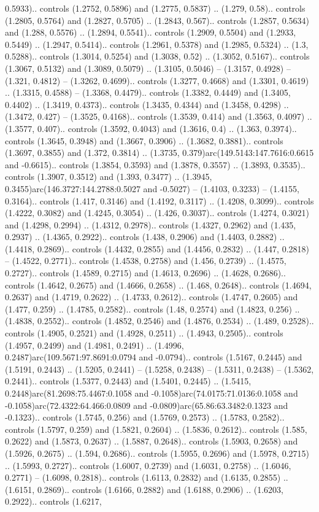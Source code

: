 0.5933).. controls (1.2752, 0.5896) and (1.2775, 0.5837) .. (1.279, 0.58).. controls (1.2805, 0.5764) and (1.2827, 0.5705) .. (1.2843, 0.567).. controls (1.2857, 0.5634) and (1.288, 0.5576) .. (1.2894, 0.5541).. controls (1.2909, 0.5504) and (1.2933, 0.5449) .. (1.2947, 0.5414).. controls (1.2961, 0.5378) and (1.2985, 0.5324) .. (1.3, 0.5288).. controls (1.3014, 0.5254) and (1.3038, 0.52) .. (1.3052, 0.5167).. controls (1.3067, 0.5132) and (1.3089, 0.5079) .. (1.3105, 0.5046) -- (1.3157, 0.4928) -- (1.321, 0.4812) -- (1.3262, 0.4699).. controls (1.3277, 0.4668) and (1.3301, 0.4619) .. (1.3315, 0.4588) -- (1.3368, 0.4479).. controls (1.3382, 0.4449) and (1.3405, 0.4402) .. (1.3419, 0.4373).. controls (1.3435, 0.4344) and (1.3458, 0.4298) .. (1.3472, 0.427) -- (1.3525, 0.4168).. controls (1.3539, 0.414) and (1.3563, 0.4097) .. (1.3577, 0.407).. controls (1.3592, 0.4043) and (1.3616, 0.4) .. (1.363, 0.3974).. controls (1.3645, 0.3948) and (1.3667, 0.3906) .. (1.3682, 0.3881).. controls (1.3697, 0.3855) and (1.372, 0.3814) .. (1.3735, 0.379)arc(149.5143:147.7616:0.6615 and -0.6615).. controls (1.3854, 0.3593) and (1.3878, 0.3557) .. (1.3893, 0.3535).. controls (1.3907, 0.3512) and (1.393, 0.3477) .. (1.3945, 0.3455)arc(146.3727:144.2788:0.5027 and -0.5027) -- (1.4103, 0.3233) -- (1.4155, 0.3164).. controls (1.417, 0.3146) and (1.4192, 0.3117) .. (1.4208, 0.3099).. controls (1.4222, 0.3082) and (1.4245, 0.3054) .. (1.426, 0.3037).. controls (1.4274, 0.3021) and (1.4298, 0.2994) .. (1.4312, 0.2978).. controls (1.4327, 0.2962) and (1.435, 0.2937) .. (1.4365, 0.2922).. controls (1.438, 0.2906) and (1.4403, 0.2882) .. (1.4418, 0.2869).. controls (1.4432, 0.2855) and (1.4456, 0.2832) .. (1.447, 0.2818) -- (1.4522, 0.2771).. controls (1.4538, 0.2758) and (1.456, 0.2739) .. (1.4575, 0.2727).. controls (1.4589, 0.2715) and (1.4613, 0.2696) .. (1.4628, 0.2686).. controls (1.4642, 0.2675) and (1.4666, 0.2658) .. (1.468, 0.2648).. controls (1.4694, 0.2637) and (1.4719, 0.2622) .. (1.4733, 0.2612).. controls (1.4747, 0.2605) and (1.477, 0.259) .. (1.4785, 0.2582).. controls (1.48, 0.2574) and (1.4823, 0.256) .. (1.4838, 0.2552).. controls (1.4852, 0.2546) and (1.4876, 0.2534) .. (1.489, 0.2528).. controls (1.4905, 0.2521) and (1.4928, 0.2511) .. (1.4943, 0.2505).. controls (1.4957, 0.2499) and (1.4981, 0.2491) .. (1.4996, 0.2487)arc(109.5671:97.8691:0.0794 and -0.0794).. controls (1.5167, 0.2445) and (1.5191, 0.2443) .. (1.5205, 0.2441) -- (1.5258, 0.2438) -- (1.5311, 0.2438) -- (1.5362, 0.2441).. controls (1.5377, 0.2443) and (1.5401, 0.2445) .. (1.5415, 0.2448)arc(81.2698:75.4467:0.1058 and -0.1058)arc(74.0175:71.0136:0.1058 and -0.1058)arc(72.4322:64.466:0.0809 and -0.0809)arc(65.86:63.3482:0.1323 and -0.1323).. controls (1.5745, 0.256) and (1.5769, 0.2573) .. (1.5783, 0.2582).. controls (1.5797, 0.259) and (1.5821, 0.2604) .. (1.5836, 0.2612).. controls (1.585, 0.2622) and (1.5873, 0.2637) .. (1.5887, 0.2648).. controls (1.5903, 0.2658) and (1.5926, 0.2675) .. (1.594, 0.2686).. controls (1.5955, 0.2696) and (1.5978, 0.2715) .. (1.5993, 0.2727).. controls (1.6007, 0.2739) and (1.6031, 0.2758) .. (1.6046, 0.2771) -- (1.6098, 0.2818).. controls (1.6113, 0.2832) and (1.6135, 0.2855) .. (1.6151, 0.2869).. controls (1.6166, 0.2882) and (1.6188, 0.2906) .. (1.6203, 0.2922).. controls (1.6217, 